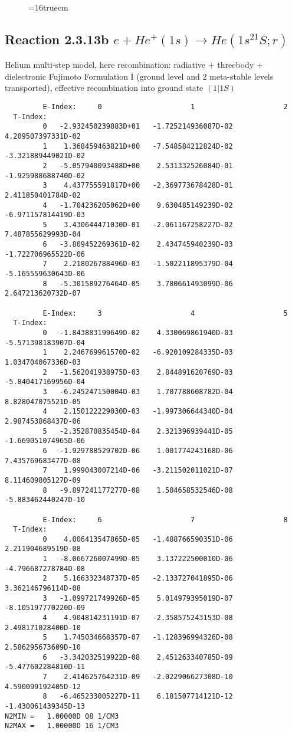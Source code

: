 \documentclass[12pt,dvipdfmx]{article}
\begin{document}
\begin{figure} \label{2.3.13a}
\epsfxsize=16truecm
\end{figure}
\newpage
\subsection{
Reaction 2.3.13b  $e + He^+(1s) \rightarrow He(1s^21S;r) $
}
Helium multi-step model, here recombination: radiative + threebody + dielectronic
 Fujimoto Formulation I (ground level and 2 meta-stable levels transported),
effective recombination into ground state $(1|1S)$


\begin{small}\begin{verbatim}
         E-Index:     0                     1                     2
  T-Index:
         0   -2.932450239883D+01   -1.725214936087D-02    4.209507397331D-02
         1    1.368459463821D+00   -7.548584212824D-02   -3.321889449021D-02
         2   -5.057940093488D+00    2.531332526084D-01   -1.925988688740D-02
         3    4.437755591817D+00   -2.369773678428D-01    2.411850401784D-02
         4   -1.704236205062D+00    9.630485149239D-02   -6.971157814419D-03
         5    3.430644471030D-01   -2.061167258227D-02    7.487855629993D-04
         6   -3.809452269361D-02    2.434745940239D-03   -1.722706965522D-06
         7    2.218026788496D-03   -1.502211895379D-04   -5.165559630643D-06
         8   -5.301589276464D-05    3.780661493099D-06    2.647213620732D-07

         E-Index:     3                     4                     5
  T-Index:
         0   -1.843883199649D-02    4.330069861940D-03   -5.571398183907D-04
         1    2.246769961570D-02   -6.920109284335D-03    1.034704067336D-03
         2   -1.562041938975D-03    2.844891620769D-03   -5.840417169956D-04
         3   -6.245247150004D-03    1.707788608782D-04    8.828047075521D-05
         4    2.150122229030D-03   -1.997306644340D-04    2.987453868437D-06
         5   -2.352870835454D-04    2.321396939441D-05   -1.669051074965D-06
         6   -1.929788529702D-06    1.001774243168D-06    7.435769683477D-08
         7    1.999043007214D-06   -3.211502011021D-07    8.114609805127D-09
         8   -9.897241177277D-08    1.504658532546D-08   -5.883462440247D-10

         E-Index:     6                     7                     8
  T-Index:
         0    4.006413547865D-05   -1.488766590351D-06    2.211904689519D-08
         1   -8.066726007499D-05    3.137222500010D-06   -4.796687278784D-08
         2    5.166332348737D-05   -2.133727041895D-06    3.362146796114D-08
         3   -1.099721749926D-05    5.014979395019D-07   -8.105197770220D-09
         4    4.904814231191D-07   -2.358575243153D-08    2.498171028400D-10
         5    1.745034668357D-07   -1.128396994326D-08    2.586295673609D-10
         6   -3.342032519922D-08    2.451263340785D-09   -5.477602284810D-11
         7    2.414625764231D-09   -2.022906627308D-10    4.590099192405D-12
         8   -6.465233005227D-11    6.181507714121D-12   -1.430061439345D-13
N2MIN =   1.00000D 08 1/CM3
N2MAX =   1.00000D 16 1/CM3


\end{verbatim}
\end{small}
\end{document}
